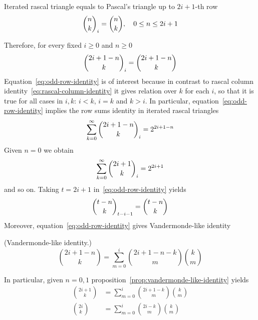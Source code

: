\begin{proposition}
    \label{prop:odd-row-proposition}
    Iterated rascal triangle equals to Pascal's triangle up to $2i+1$-th row
    \begin{align*}
        \binom{n}{k}_{i} = \binom{n}{k}, \quad 0 \leq n \leq 2i+1
    \end{align*}
\end{proposition}
Therefore, for every fixed $i \geq 0$ and $n \geq 0$
\begin{equation}
    \binom{2i+1-n}{k}_{i} = \binom{2i+1-n}{k}
    \label{eq:odd-row-identity}
\end{equation}
Equation~\eqref{eq:odd-row-identity} is of interest because in contrast to rascal
column identity~\eqref{eq:rascal-column-identity} it gives relation over $k$ for each $i$,
so that it is true for all cases in $i,k$: $i < k$, $i=k$ and $k >i$.
In particular, equation~\eqref{eq:odd-row-identity} implies the row sums identity in iterated rascal triangles
\begin{align*}
    \sum_{k=0}^{\infty} \binom{2i+1-n}{k}_{i} = 2^{2i+1-n}
\end{align*}
Given $n=0$ we obtain
\begin{align*}
    \sum_{k=0}^{\infty} \binom{2i+1}{k}_{i} = 2^{2i+1}
\end{align*}
and so on.
Taking $t=2i+1$ in~\eqref{eq:odd-row-identity} yields
\begin{align*}
    \binom{t-n}{k}_{t-i-1}= \binom{t-n}{k}
\end{align*}
Moreover, equation~\eqref{eq:odd-row-identity} gives Vandermonde-like identity
\begin{proposition} (Vandermonde-like identity.)
    \label{prop:vandermonde-like-identity}
    \begin{equation*}
        \binom{2i+1-n}{k} = \sum_{m=0}^{i} \binom{2i+1-n-k}{m} \binom{k}{m}
    \end{equation*}
\end{proposition}
In particular, given $n=0,1$ proposition~\eqref{prop:vandermonde-like-identity} yields
\begin{align*}
    \binom{2i+1}{k} &= \sum_{m=0}^{i} \binom{2i+1-k}{m} \binom{k}{m} \\
    \binom{2i}{k}   &= \sum_{m=0}^{i} \binom{2i-k}{m} \binom{k}{m}
\end{align*}
